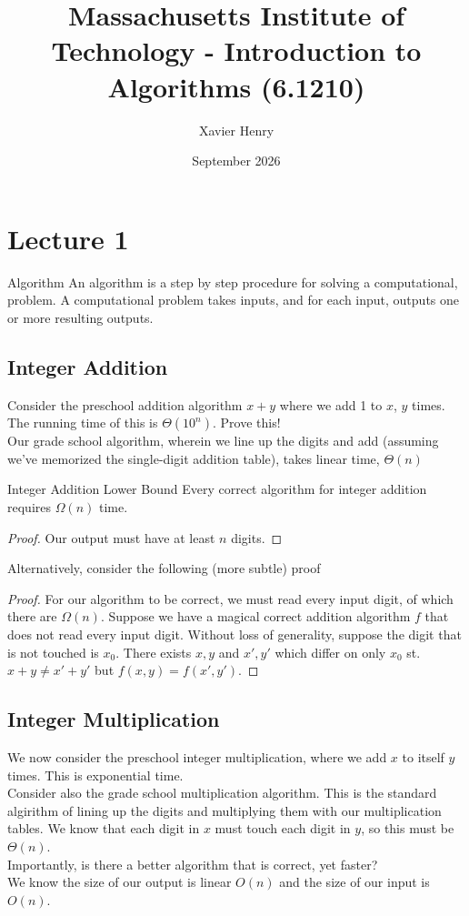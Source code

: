 \documentclass[11pt]{article}
\title{Massachusetts Institute of Technology - Introduction to Algorithms (6.1210)}
\author{Xavier Henry}
\date{September 2026}
\begin{document}
\maketitle

\tableofcontents \newpage

\section{Lecture 1}
\begin{definitionbox}{Algorithm}
    An algorithm is a step by step procedure for solving a computational, problem. A computational problem takes inputs, and for each input, outputs one or more resulting outputs.
\end{definitionbox}

\subsection{Integer Addition}

Consider the preschool addition algorithm $x + y$ where we add 1 to $x$, $y$ times. The running time of this is $\Theta(10^n)$. Prove this! \\
Our grade school algorithm, wherein we line up the digits and add (assuming we've memorized the single-digit addition table), takes linear time, $\Theta(n)$

\begin{theorembox}{Integer Addition Lower Bound}
    Every correct algorithm for integer addition requires $\Omega(n)$ time.
\end{theorembox}

\begin{proof}
    Our output must have at least $n$ digits.
\end{proof}

Alternatively, consider the following (more subtle) proof
\begin{proof}
    For our algorithm to be correct, we must read every input digit, of which there are $\Omega(n)$.
    Suppose we have a magical correct addition algorithm $f$ that does not read every input digit. Without loss of generality, suppose the digit that is not touched is $x_0$. There exists  $x,y$ and $x',y'$ which differ on only $x_0$ st. $x+y \neq x'+y'$ but $f(x,y) = f(x',y')$.
\end{proof}

\subsection{Integer Multiplication}
We now consider the preschool integer multiplication, where we add $x$ to itself $y$ times. This is exponential time. \\ %
Consider also the grade school multiplication algorithm. This is the standard algirithm of lining up the digits and multiplying them with our multiplication tables. We know that each digit in $x$ must touch each digit in $y$, so this must be $\Theta(n)$. \\
Importantly, is there a better algorithm that is correct, yet faster? \\
We know the size of our output is linear $O(n)$ and the size of our input is $O(n)$.
\end{document}
